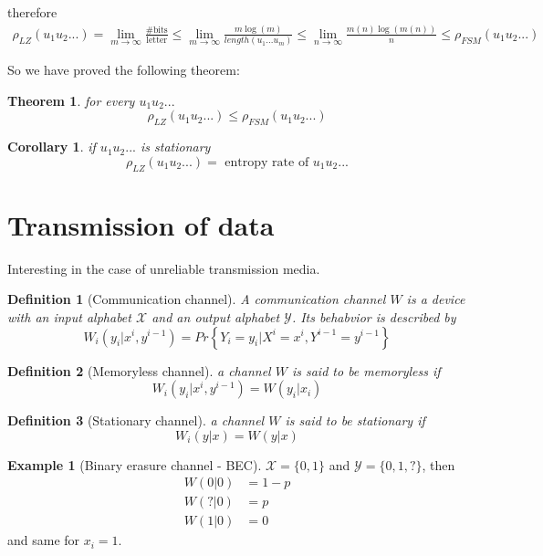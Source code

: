 \documentclass[twoside]{article}
\newtheorem{theorem}{Theorem}[section]
\newtheorem{corollary}{Corollary}[theorem]
\newtheorem{definition}{Definition}[section]
\theoremstyle{definition} %
\newtheorem{example}{Example}
\renewcommand{\Pr}[1]{Pr\left\{#1\right\}}
\def\X{\mathcal{X}}
\def\Y{\mathcal{Y}}
\begin{document}
therefore
\begin{align*}
  \rho_{LZ}(u_1 u_2 ...) = \lim_{m \to \infty} \frac{\text{\# bits}}{\text{letter}} \leq \lim_{m \to \infty} \frac{m \log(m)}{length(u_1 ... u_m)} \leq \lim_{n \to \infty} \frac{m(n) \log(m(n))}{n} \leq \rho_{FSM}(u_1 u_2 ...)
\end{align*}

So we have proved the following theorem:

\begin{theorem}
  for every $u_1 u_2 ...$
  $$ \rho_{LZ}(u_1 u_2 ...) \leq \rho_{FSM}(u_1 u_2 ...) $$
\end{theorem}

\begin{corollary}
  if $u_1 u_2 ...$ is stationary
  $$ \rho_{LZ}(u_1 u_2 ...) = \text{ entropy rate of } u_1 u_2 ...$$
\end{corollary}




\cleardoublepage
\section{Transmission of data}

Interesting in the case of unreliable transmission media.

\begin{definition}[Communication channel]
  A communication channel $W$ is a device with an input alphabet $\X$ and an output
  alphabet $\Y$. Its behabvior is described by
  \[
    W_i(y_i | x^i, y^{i-1}) = \Pr{Y_i = y_i | X^i = x^i, Y^{i-1} = y^{i-1}}
  \]
\end{definition}

\begin{definition}[Memoryless channel]
  a channel $W$ is said to be memoryless if
  \[
      W_i(y_i | x^i, y^{i-1}) = W(y_i|x_i)
    \]
\end{definition}

\begin{definition}[Stationary channel]
  a channel $W$ is said to be stationary if
  \[
      W_i(y|x) = W(y|x)
    \]
\end{definition}

\begin{example}[Binary erasure channel - BEC]
  $\X = \{0,1\}$ and $\Y = \{0,1,?\}$, then
  \begin{align*}
    W(0|0) &= 1 - p\\
    W(?|0) &= p\\
    W(1|0) &= 0
  \end{align*}
  and same for $x_i=1$.
\end{example}
\end{document}
